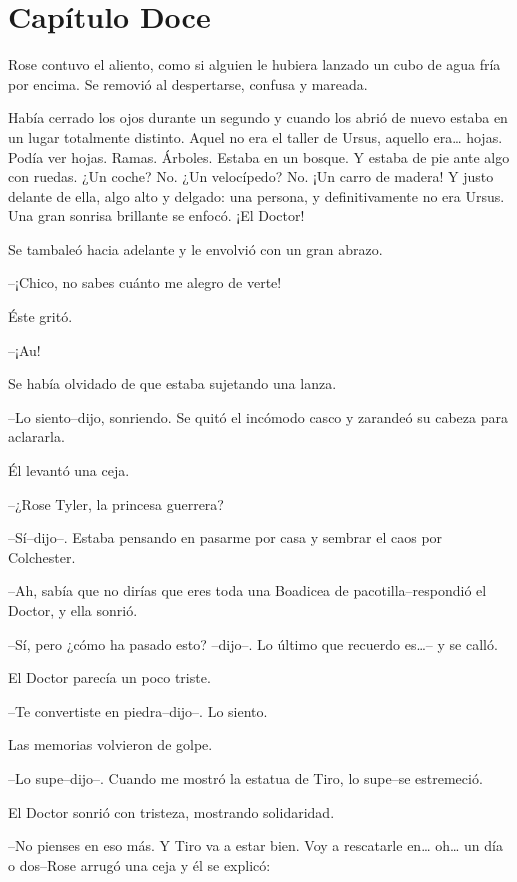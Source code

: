 \chapter*{Capítulo Doce}

Rose contuvo el aliento, como si alguien le hubiera lanzado un cubo de
agua fría por encima. Se removió al despertarse, confusa y mareada.

Había cerrado los ojos durante un segundo y cuando los abrió de nuevo
estaba en un lugar totalmente distinto. Aquel no era el taller de Ursus,
aquello era\ldots{} hojas. Podía ver hojas. Ramas. Árboles. Estaba en un
bosque. Y estaba de pie ante algo con ruedas. ¿Un coche? No. ¿Un
velocípedo? No. ¡Un carro de madera! Y justo delante de ella, algo alto
y delgado: una persona, y definitivamente no era Ursus. Una gran sonrisa
brillante se enfocó. ¡El Doctor!

Se tambaleó hacia adelante y le envolvió con un gran abrazo.

--¡Chico, no sabes cuánto me alegro de verte!

Éste gritó.

--¡Au!

Se había olvidado de que estaba sujetando una lanza.

--Lo siento--dijo, sonriendo. Se quitó el incómodo casco y zarandeó su
cabeza para aclararla.

Él levantó una ceja.

--¿Rose Tyler, la princesa guerrera?

--Sí--dijo--. Estaba pensando en pasarme por casa y sembrar el caos por
Colchester.

--Ah, sabía que no dirías que eres toda una Boadicea de
pacotilla--respondió el Doctor, y ella sonrió.

--Sí, pero ¿cómo ha pasado esto? --dijo--. Lo último que recuerdo
es\ldots{}-- y se calló.

El Doctor parecía un poco triste.

--Te convertiste en piedra--dijo--. Lo siento.

Las memorias volvieron de golpe.

--Lo supe--dijo--. Cuando me mostró la estatua de Tiro, lo supe--se
estremeció.

El Doctor sonrió con tristeza, mostrando solidaridad.

--No pienses en eso más. Y Tiro va a estar bien. Voy a rescatarle
en\ldots{} oh\ldots{} un día o dos--Rose arrugó una ceja y él se
explicó:

